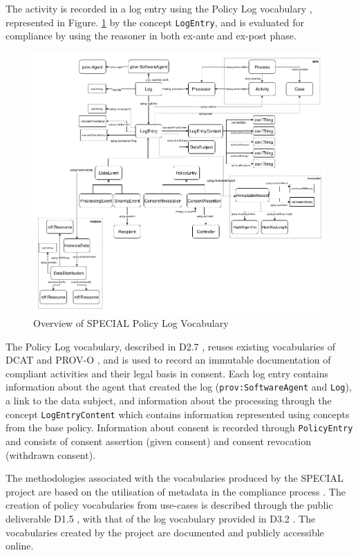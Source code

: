 The activity is recorded in a log entry using the Policy Log vocabulary \cite{bonatti_special_2018-1}, represented in Figure. \ref{fig:SPECIAL-policy-log-vocabulary} by the concept \texttt{LogEntry}, and is evaluated for compliance by using the reasoner in both ex-ante and ex-post phase. 
\begin{figure}[htbp]
    \centering
    \includegraphics[width=0.8\linewidth]{img/SPECIAL_logvocabulary.png}
    \caption{Overview of SPECIAL Policy Log Vocabulary \cite{bonatti_special_2018-1}}
    \label{fig:SPECIAL-policy-log-vocabulary}
\end{figure}

The Policy Log vocabulary, described in D2.7 \cite{kirrane_d2.7_2018}, reuses existing vocabularies of DCAT and PROV-O \cite{lebo_prov-o_2013}, and is used to record an immutable documentation of compliant activities and their legal basis in consent. Each log entry contains information about the agent that created the log (\texttt{prov:SoftwareAgent} and \texttt{Log}), a link to the data subject, and information about the processing through the concept \texttt{LogEntryContent} which contains information represented using concepts from the base policy.
Information about consent is recorded through \texttt{PolicyEntry} and consists of consent assertion (given consent) and consent revocation (withdrawn consent).

The methodologies associated with the vocabularies produced by the SPECIAL project are based on the utilisation of metadata in the compliance process \cite{wenning_compliance_2018}. The creation of policy vocabularies from use-cases is described through the public deliverable D1.5 \cite{bonatti_d1.5_2018}, with that of the log vocabulary provided in D3.2 \cite{kirrane_d2.7_2018}. The vocabularies created by the project are documented and publicly accessible online.

